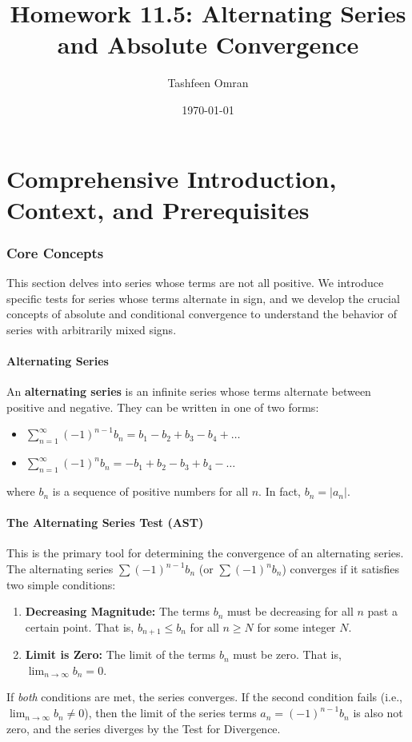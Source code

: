 \documentclass{article}
\title{Homework 11.5: Alternating Series and Absolute Convergence}
\author{Tashfeen Omran}
\date{\today}
\begin{document}
\maketitle

\part{Comprehensive Introduction, Context, and Prerequisites}

\section{Core Concepts}

This section delves into series whose terms are not all positive. We introduce specific tests for series whose terms alternate in sign, and we develop the crucial concepts of absolute and conditional convergence to understand the behavior of series with arbitrarily mixed signs.

\subsection{Alternating Series}
An \textbf{alternating series} is an infinite series whose terms alternate between positive and negative. They can be written in one of two forms:
\begin{itemize}
    \item $\sum_{n=1}^{\infty} (-1)^{n-1}b_n = b_1 - b_2 + b_3 - b_4 + \dots$
    \item $\sum_{n=1}^{\infty} (-1)^{n}b_n = -b_1 + b_2 - b_3 + b_4 - \dots$
\end{itemize}
where $b_n$ is a sequence of positive numbers for all $n$. In fact, $b_n = |a_n|$.

\subsection{The Alternating Series Test (AST)}
This is the primary tool for determining the convergence of an alternating series. The alternating series $\sum (-1)^{n-1}b_n$ (or $\sum (-1)^{n}b_n$) converges if it satisfies two simple conditions:
\begin{enumerate}
    \item \textbf{Decreasing Magnitude:} The terms $b_n$ must be decreasing for all $n$ past a certain point. That is, $b_{n+1} \le b_n$ for all $n \ge N$ for some integer $N$.
    \item \textbf{Limit is Zero:} The limit of the terms $b_n$ must be zero. That is, $\lim_{n \to \infty} b_n = 0$.
\end{enumerate}
If \textit{both} conditions are met, the series converges. If the second condition fails (i.e., $\lim_{n \to \infty} b_n \neq 0$), then the limit of the series terms $a_n = (-1)^{n-1}b_n$ is also not zero, and the series diverges by the Test for Divergence.
\end{document}
